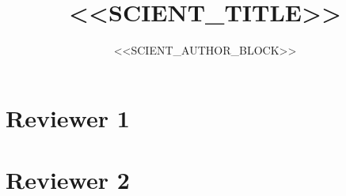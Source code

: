 \documentclass[11pt,a4paper]{article}
\title{<<SCIENT_TITLE>>}
\author{<<SCIENT_AUTHOR_BLOCK>>}
\date{}
\begin{document}
\maketitle

\par

\section*{Reviewer 1}

\begin{quote}
\end{quote}

\par

\section*{Reviewer 2}

\begin{quote}
\end{quote}

\par
\end{document}
